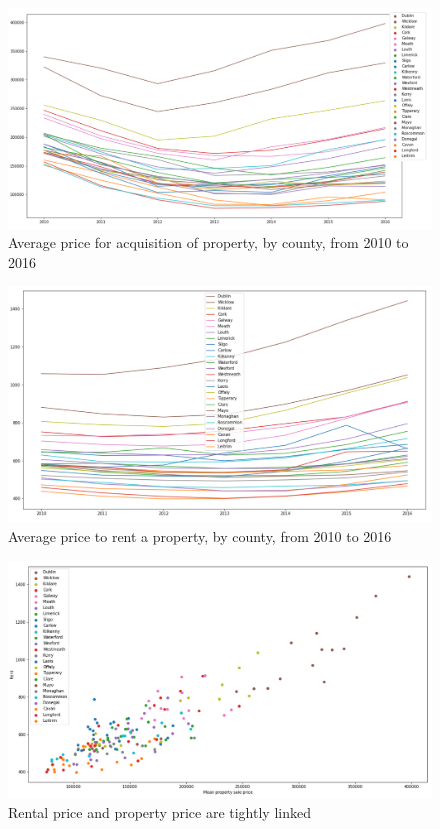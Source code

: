 \documentclass[twocolumn]{article}
\begin{document}
\begin{figure}[h]
	\centering
	\includegraphics[scale=0.5]{media/property_price.png}
	\caption{Average price for acquisition of property, by county, from 2010 to 2016}
	\label{fig2}
\end{figure}

\begin{figure}[h]
	\centering
	\includegraphics[scale=0.5]{media/rent_price.png}
	\caption{Average price to rent a property, by county, from 2010 to 2016}
	\label{fig3}
\end{figure}

\begin{figure}[h]
	\centering
	\includegraphics[scale=0.5]{media/correlation_rent_acquisition.png}
	\caption{Rental price and property price are tightly linked}
	\label{fig4}
\end{figure}
\end{document}
